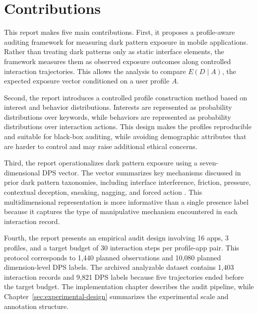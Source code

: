 \section{Contributions}

This report makes five main contributions. First, it proposes a profile-aware auditing framework for measuring dark pattern exposure in mobile applications. Rather than treating dark patterns only as static interface elements, the framework measures them as observed exposure outcomes along controlled interaction trajectories. This allows the analysis to compare \(E(D \mid A)\), the expected exposure vector conditioned on a user profile \(A\).

Second, the report introduces a controlled profile construction method based on interest and behavior distributions. Interests are represented as probability distributions over keywords, while behaviors are represented as probability distributions over interaction actions. This design makes the profiles reproducible and suitable for black-box auditing, while avoiding demographic attributes that are harder to control and may raise additional ethical concerns.

Third, the report operationalizes dark pattern exposure using a seven-dimensional DPS vector. The vector summarizes key mechanisms discussed in prior dark pattern taxonomies, including interface interference, friction, pressure, contextual deception, sneaking, nagging, and forced action \cite{gray2018darkpatterns,mathur2019darkpatterns,mathur2021whatmakesdark}. This multidimensional representation is more informative than a single presence label because it captures the type of manipulative mechanism encountered in each interaction record.

Fourth, the report presents an empirical audit design involving 16 apps, 3 profiles, and a target budget of 30 interaction steps per profile-app pair. This protocol corresponds to 1{,}440 planned observations and 10{,}080 planned dimension-level DPS labels. The archived analyzable dataset contains 1{,}403 interaction records and 9{,}821 DPS labels because five trajectories ended before the target budget. The implementation chapter describes the audit pipeline, while Chapter~\ref{sec:experimental-design} summarizes the experimental scale and annotation structure.

